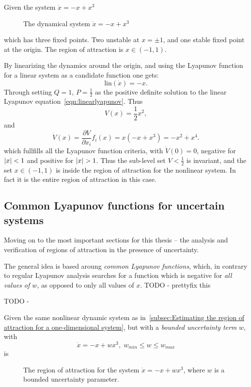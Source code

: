 Given the system \(\dot{x} = -x + x^3\)

\begin{figure}
  
  \caption{The dynamical system \(\dot{x} = -x + x^3\)}
\end{figure}
which has three fixed points. Two unstable at \(x = \pm 1\), and one stable
fixed point at the origin. The region of attraction is \(x \in \left( -1, 1
\right)\).

By linearizing the dynamics around the origin, and using the Lyapunov function
for a linear system as a candidate function one gets:
\[
  \text{lin}(\dot{x}) = -x.
\]
Through setting \(Q=1\), \(P=\frac{1}{2}\) as the positive definite solution to
the linear Lyapunov equation~\ref{eqn:linearlyapunov}. Thus
\[
  V(x) = \frac{1}{2}x^2,
\]
and
\[
  \dot{V}(x) = \frac{\partial V}{\partial x_i} f_i(x) = x(-x + x^3) = -x^2 +
  x^4.
\]
which fullfills all the Lyapunov function criteria, with \(\dot{V}(0) = 0\),
negative for \(\lvert x\rvert<1\) and positive for \(\lvert x\rvert > 1\). Thus the sub-level
set \(V < \frac{1}{2}\) is invariant, and the set \(x \in \left( -1, 1 \right)\)
is inside the region of attraction for the nonlinear system. In fact it is the
entire region of attraction in this case.

\subsection{Common Lyapunov functions for uncertain systems}

Moving on to the most important sections for this thesis -- the analysis and
verification of regions of attraction in the presence of uncertainty.

The general idea is based aroung \textit{common Lyapunov functions}, which, in
contrary to regular Lyapunov analysis searches for a function which is negative
for \textit{all values of \(w\)}, as opposed to only all values of \(x\). TODO -
prettyfix this

\begin{definition}
  TODO -
\end{definition}

\begin{example}
  Given the same nonlinear dynamic system as in~\ref{subsec:Estimating the
    region of attraction for a one-dimensional system}, but with a
  \textit{bounded uncertainty term} \(w\), with
  \[
    \dot{x} = -x + wx^3, \; w_{min} \leq w \leq w_{max}
  \]
  is

  \begin{figure}
  \begin{centering}
    
  \end{centering}
  \caption{The region of attraction for the system \(\dot{x} = -x + wx^3\),
  where \(w\) is a bounded uncertainty parameter.}
  \end{figure}
\end{example}

